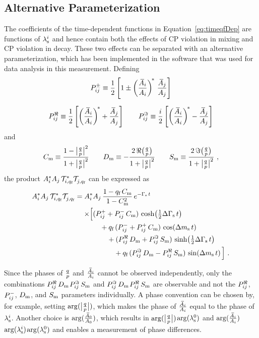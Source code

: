 \subsection{Alternative Parameterization}
\label{subsec:pheno_time_altParam}
The coefficients of the time-dependent functions in Equation~\ref{eq:timeqfDep} are functions of $\lamsi$ and hence contain both the
effects of CP violation in mixing and CP violation in decay. These two effects can be separated with an alternative parameterization, which
has been implemented in the software that was used for data analysis in this measurement. Defining
\begin{equation}
  \label{eq:decayRho}
  \begin{gathered}
    \Ppm \equiv \frac{1}{2} \left[ 1 \pm \left(\frac{\Abari}{\Ai}\right)^{\!*}\, \frac{\Abari[j]}{\Ai[j]} \right] \\[0.6em]
    \Pre \equiv \frac{1}{2} \left[ \left(\frac{\Abari}{\Ai}\right)^{\!*} + \frac{\Abari[j]}{\Ai[j]} \right] \quad\quad
    \Pim \equiv \frac{i}{2} \left[ \left(\frac{\Abari}{\Ai}\right)^{\!*} - \frac{\Abari[j]}{\Ai[j]} \right]
  \end{gathered}
\end{equation}
and
\begin{equation}
  \label{eq:mixCDS}
  \Cm \equiv \frac{1-\qpAbsAlt^2}{1+\qpAbsAlt^2}
  \qquad \Dm \equiv -\frac{2\,\Re\big(\qpAlt\big)}{1+\qpAbsAlt^2}
  \qquad \Sm \equiv  \frac{2\,\Im\big(\qpAlt\big)}{1+\qpAbsAlt^2}
  \ ,
\end{equation}
the product $\Ai^*\Ai[j]\,\timeAmp[i,\qf]^*\timeAmp[j,\qf]^{\phantom{*}}$ can be expressed as
\begin{equation}
  \label{eq:timeqfDepSep}
  \begin{aligned}
    \Ai^*\Ai[j]\,\timeAmp[i,\qf]^*\timeAmp[j,\qf]^{\phantom{*}} =
      \Ai^*&\Ai[j]\, \frac{1-\qf\,\Cm}{1-\Cm^2}\, \eGst \\
        \times\Big[ &(\Ppl+\Pmn\,\Cm)\,\cDGs \\
                    &\quad + \qf\,(\Pmn+\Ppl\,\Cm)\,\cDms \\
                    &\quad\quad + (\Pre\,\Dm+\Pim\,\Sm)\,\sDGs \\
                    &\quad\quad\quad + \qf\,(\Pim\,\Dm-\Pre\,\Sm)\,\sDms \Big] \ .
  \end{aligned}
\end{equation}

Since the phases of $\qp$ and $\frac{\Abari}{\Ai}$ cannot be observed independently, only the combinations $\Pre\,\Dm$\textplus$\Pim\,\Sm$
and $\Pim\,\Dm$\textminus$\Pre\,\Sm$ are observable and not the $\Pre$, $\Pmn$, $\Dm$, and $\Sm$ parameters individually. A phase
convention can be chosen by, for example, setting $\arg(\qpAbsAlt)$, which makes the phase of $\frac{\Abari}{\Ai}$ equal
to the phase of $\lamsi$. Another choice is $\arg(\frac{\Abari[\text{0}]}{\Ai[\text{0}]})$,
which results in $\arg(\qpAbsAlt)$\texteq$\arg(\lamsi[\text{0}])$ and
$\arg(\frac{\Abari}{\Ai})$\texteq$\arg(\lamsi)$\textminus$\arg(\lamsi[\text{0}])$ and enables a measurement of phase differences.
